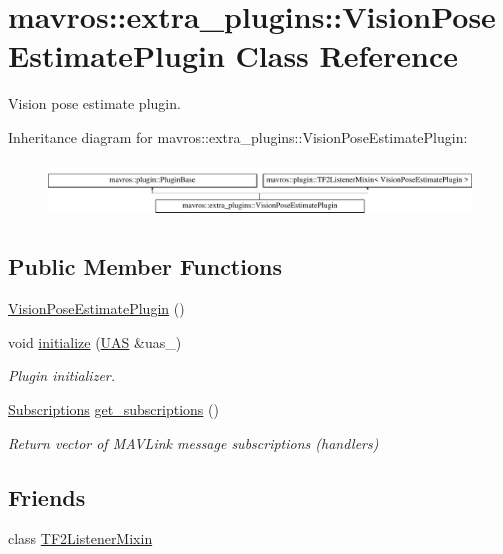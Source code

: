 \hypertarget{classmavros_1_1extra__plugins_1_1VisionPoseEstimatePlugin}{}\section{mavros\+::extra\+\_\+plugins\+::Vision\+Pose\+Estimate\+Plugin Class Reference}
\label{classmavros_1_1extra__plugins_1_1VisionPoseEstimatePlugin}


Vision pose estimate plugin.  


Inheritance diagram for mavros\+::extra\+\_\+plugins\+::Vision\+Pose\+Estimate\+Plugin\+:\begin{figure}[H]
\begin{center}
\leavevmode
\includegraphics[height=1.505376cm]{classmavros_1_1extra__plugins_1_1VisionPoseEstimatePlugin}
\end{center}
\end{figure}
\subsection*{Public Member Functions}
\begin{DoxyCompactItemize}
\item 
\mbox{\hyperlink{group__plugin_ga5a78aaf3ee493b641c7ae03f3f625f37}{Vision\+Pose\+Estimate\+Plugin}} ()
\item 
void \mbox{\hyperlink{group__plugin_gac952eeee9513bc64dffeec777c8404dc}{initialize}} (\mbox{\hyperlink{classmavros_1_1UAS}{U\+AS}} \&uas\+\_\+)
\begin{DoxyCompactList}\small\item\em Plugin initializer. \end{DoxyCompactList}\item 
\mbox{\hyperlink{group__plugin_ga8967d61fc77040e0c3ea5a4585d62a09}{Subscriptions}} \mbox{\hyperlink{group__plugin_ga89567b4d29bc8a805270e131c89fab3d}{get\+\_\+subscriptions}} ()
\begin{DoxyCompactList}\small\item\em Return vector of M\+A\+V\+Link message subscriptions (handlers) \end{DoxyCompactList}\end{DoxyCompactItemize}
\subsection*{Friends}
\begin{DoxyCompactItemize}
\item 
class \mbox{\hyperlink{group__plugin_ga0eb3bbd8737231d2db969230d1d8b54b}{T\+F2\+Listener\+Mixin}}
\end{DoxyCompactItemize}
